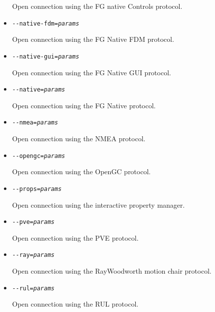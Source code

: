 \begin{itemize}
  Open connection using the FG native Controls protocol.

\item{\texttt{-$ $-native-fdm={\it params}}}

  Open connection using the FG Native FDM protocol.

\item{\texttt{-$ $-native-gui={\it params}}}

  Open connection using the FG Native GUI protocol.

\item{\texttt{-$ $-native={\it params}}}

  Open connection using the FG Native protocol.

\item{\texttt{-$ $-nmea={\it params}}}

  Open connection using the NMEA protocol.

\item{\texttt{-$ $-opengc={\it params}}}

  Open connection using the OpenGC protocol.

\item{\texttt{-$ $-props={\it params}}}

  Open connection using the interactive property manager.

\item{\texttt{-$ $-pve={\it params}}}

  Open connection using the PVE protocol.

\item{\texttt{-$ $-ray={\it params}}}

  Open connection using the RayWoodworth motion chair protocol.

\item{\texttt{-$ $-rul={\it params}}}

  Open connection using the RUL protocol.

\end{itemize}

